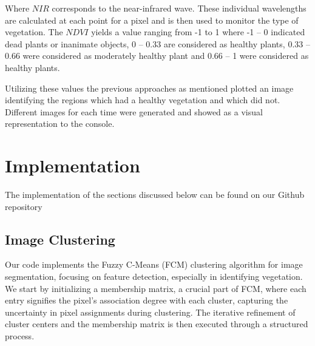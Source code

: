 \documentclass[12pt,a4paper,IEEEtran]{article}
\begin{document}
Where $NIR$ corresponds to the near-infrared wave. These individual wavelengths are calculated at each point for a pixel and is then used to monitor the type of vegetation. The $NDVI$ yields a value ranging from -1 to 1 where -1 – 0 indicated dead plants or inanimate objects, 0 – 0.33 are considered as healthy plants, 0.33 – 0.66 were considered as moderately healthy plant and 0.66 – 1 were considered as healthy plants.  
 
Utilizing these values the previous approaches as mentioned plotted an image identifying the regions which had a healthy vegetation and which did not. Different images for each time were generated and showed as a visual representation to the console. 

 


\section{Implementation}
The implementation of the sections discussed below can be found on our Github repository \cite{adip_group_project}
\subsection{Image Clustering}
Our code implements the Fuzzy C-Means (FCM) clustering algorithm for image segmentation, focusing on feature detection, especially in identifying vegetation. We start by initializing a membership matrix, a crucial part of FCM, where each entry signifies the pixel's association degree with each cluster, capturing the uncertainty in pixel assignments during clustering. The iterative refinement of cluster centers and the membership matrix is then executed through a structured process.  
\end{document}
